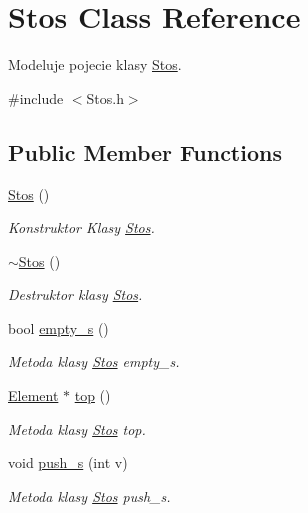 \hypertarget{class_stos}{\section{Stos Class Reference}
\label{class_stos}
}


Modeluje pojecie klasy \hyperlink{class_stos}{Stos}.  




{\ttfamily \#include $<$Stos.\-h$>$}

\subsection*{Public Member Functions}
\begin{DoxyCompactItemize}
\item 
\hyperlink{class_stos_a1de3b50386d5dfb56ddece17d0ea2389}{Stos} ()
\begin{DoxyCompactList}\small\item\em Konstruktor Klasy \hyperlink{class_stos}{Stos}. \end{DoxyCompactList}\item 
\hyperlink{class_stos_af9a198e2540e18adcc0b5259105fd78e}{$\sim$\-Stos} ()
\begin{DoxyCompactList}\small\item\em Destruktor klasy \hyperlink{class_stos}{Stos}. \end{DoxyCompactList}\item 
bool \hyperlink{class_stos_a701ece81a7bdc6fa81785e2630298ad5}{empty\-\_\-s} ()
\begin{DoxyCompactList}\small\item\em Metoda klasy \hyperlink{class_stos}{Stos} empty\-\_\-s. \end{DoxyCompactList}\item 
\hyperlink{struct_element}{Element} $\ast$ \hyperlink{class_stos_a918b85a2513574e11073d93c59cae611}{top} ()
\begin{DoxyCompactList}\small\item\em Metoda klasy \hyperlink{class_stos}{Stos} top. \end{DoxyCompactList}\item 
void \hyperlink{class_stos_af629728e86c8d4369f3216dfd4b9f9c0}{push\-\_\-s} (int v)
\begin{DoxyCompactList}\small\item\em Metoda klasy \hyperlink{class_stos}{Stos} push\-\_\-s. \end{DoxyCompactList}\item 

\end{DoxyCompactItemize}

